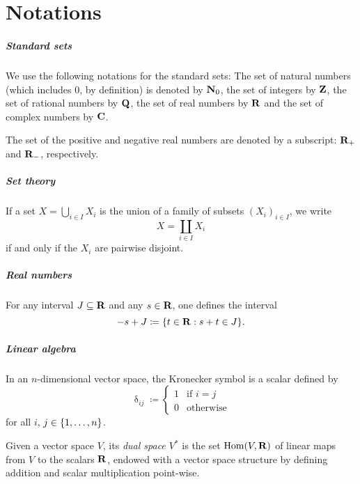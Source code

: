 \chapter*{Notations}

\paragraph{Standard sets}
We use the following notations for the standard sets: The set of natural
numbers (which includes $0$, by definition) is denoted by $\mathbf{N}_0$, the set
of integers by $\mathbf{Z}$, the set of rational numbers by $\mathbf{Q}$, the set of
real numbers by $\mathbf{R}$ and the set of complex numbers by $\mathbf{C}$.

The set of the positive and negative real numbers are denoted by a
subscript: $\mathbf{R}_+$ and $\mathbf{R}_{-}$, respectively. 

\paragraph{Set theory}

If a set $X = \bigcup_{i \in I} X_i$ is the union of a family of subsets
$(X_i)_{i \in I}$, we write
\[
  X = \coprod_{i \in I} X_i
\]
if and only if the $X_i$ are pairwise disjoint.

\paragraph{Real numbers}

For any interval $J \subseteq \mathbf{R}$ and any $s \in \mathbf{R}$, one defines the interval
\[
  - s + J \coloneqq \lbrace t \in \mathbf{R} : s + t \in J\rbrace.
\]

\paragraph{Linear algebra}

In an $n$-dimensional vector space, the Kronecker symbol is a scalar defined by 
\[
  \updelta_{ij} \coloneqq \begin{cases}
    1 & \text{if $i = j$} \\
    0 & \text{otherwise}
  \end{cases}
\]
for all $i$, $j \in \lbrace1, \dotsc, n\rbrace$.

Given a vector space $V$, its \emph{dual space $V^*$} is the set $\operatorname{Hom}(V, \mathbf{R})$
of linear maps from $V$ to the scalars $\mathbf{R}$, endowed with a vector space
structure by defining addition and scalar multiplication point-wise.

